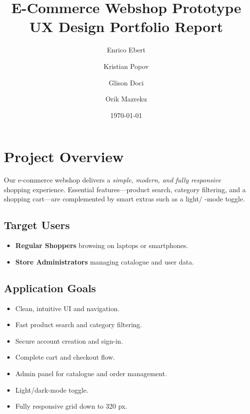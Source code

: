 \documentclass[11pt,a4paper]{article}
\begin{document}
	
	\title{\textbf{E-Commerce Webshop Prototype\\UX Design Portfolio Report}}
	\author{Enrico Ebert \and Kristian Popov \and Glison Doci \and Orik Mazreku}
	\date{\today}
	\maketitle
	\thispagestyle{empty}
	\newpage
	
	\setcounter{tocdepth}{2}
	\tableofcontents
	\newpage
	
	\section{Project Overview}\label{sec:project-overview}
	Our e-commerce webshop delivers a \emph{simple, modern, and fully responsive} shopping experience. Essential features—product search, category filtering, and a shopping cart—are complemented by smart extras such as a light/
	-mode toggle.
	
	\subsection*{Target Users}
	\begin{itemize}
		\item \textbf{Regular Shoppers} browsing on laptops or smartphones.
		\item \textbf{Store Administrators} managing catalogue and user data.
	\end{itemize}
	
	\subsection*{Application Goals}
	\begin{itemize}
		\item Clean, intuitive UI and navigation.
		\item Fast product search and category filtering.
		\item Secure account creation and sign-in.
		\item Complete cart and checkout flow.
		\item Admin panel for catalogue and order management.
		\item Light/dark-mode toggle.
		\item Fully responsive grid down to 320 px.
	\end{itemize}
	
\end{document}
